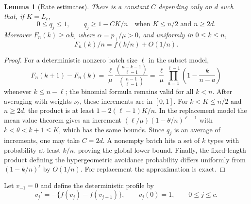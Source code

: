 \documentclass[11pt]{article}
\newtheorem{lemma}[theorem]{Lemma}
\theoremstyle{remark}\newtheorem{remark}[theorem]{Remark}
\begin{document}
\begin{lemma}[Rate estimates]\label{lem:rates}
There is a constant $C$ depending only on $d$ such that, if $K=L_c$,
\begin{equation}\label{eq:rates}
 0\le q_j\le1,\qquad q_j\ge1-CK/n
 \quad\text{when }K\le n/2\text{ and }n\ge2d.
\end{equation}
Moreover $F_n(k)\ge\alpha k$, where $\alpha=p_+/\mu>0$, and uniformly in
$0\le k\le n$,
\begin{equation}\label{eq:fluidapprox}
 F_n(k)/n=f(k/n)+O(1/n).
\end{equation}
\end{lemma}
\begin{proof}
For a deterministic nonzero batch size $\ell$ in the subset model,
\[
 F_n(k+1)-F_n(k)
 =\frac\ell\mu\frac{\binom{n-k-1}{\ell-1}}{\binom{n-1}{\ell-1}}
 =\frac\ell\mu\prod_{a=1}^{\ell-1}\left(1-\frac{k}{n-a}\right)
\]
whenever $k\le n-\ell$; the binomial formula remains valid for all $k<n$.
After averaging with weights $\nu_\ell$, these increments are in $[0,1]$.
For $k<K\le n/2$ and $n\ge2d$, the product is at least
$1-2(\ell-1)K/n$. In the replacement model the mean value theorem gives
an increment $(\ell/\mu)(1-\theta/n)^{\ell-1}$ with
$k<\theta<k+1\le K$, which has the same bounds. Since $q_j$ is an average
of increments, one may take $C=2d$.
A nonempty batch hits a set of $k$ types with probability at least $k/n$,
proving the global lower bound. Finally, the fixed-length product defining
the hypergeometric avoidance probability differs uniformly from
$(1-k/n)^\ell$ by $O(1/n)$. For replacement the approximation is exact.
\end{proof}

Let $v_{-1}=0$ and define the deterministic profile by
\begin{equation}\label{eq:ode}
 v_j'=-\{f(v_j)-f(v_{j-1})\},\qquad v_j(0)=1,
 \qquad 0\le j\le c.
\end{equation}
\end{document}
